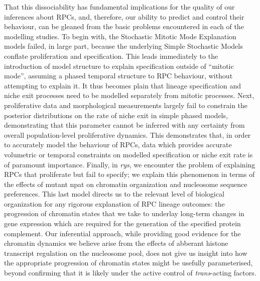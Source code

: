 That this dissociability has fundamental implications for the quality of our inferences about RPCs, and, therefore, our ability to predict and control their behaviour, can be gleaned from the basic problems encountered in each of the modelling studies. To begin with, the Stochastic Mitotic Mode Explanation models failed, in large part, because the underlying Simple Stochastic Models conflate proliferation and specification. This leads immediately to the introduction of model structure to explain specification outside of ``mitotic mode'', assuming a phased temporal structure to RPC behaviour, without attempting to explain it. It thus becomes plain that lineage specification and niche exit processes need to be modelled separately from mitotic processes. Next, proliferative data and morphological measurements largely fail to constrain the posterior distributions on the rate of niche exit in simple phased models, demonstrating that this parameter cannot be inferred with any certainty from overall population-level proliferative dynamics. This demonstrates that, in order to accurately model the behaviour of RPCs, data which provides accurate volumetric or temporal constraints on modelled specification or niche exit rate is of paramount importance. Finally, in \textit{rys}, we encounter the problem of explaining RPCs that proliferate but fail to specify; we explain this phenomenon in terms of the effects of mutant npat on chromatin organization and nucleosome sequence preferences. This last model directs us to the relevant level of biological organization for any rigorous explanation of RPC lineage outcomes: the progression of chromatin states that we take to underlay long-term changes in gene expression which are required for the generation of the specified protein complement. Our inferential approach, while providing good evidence for the chromatin dynamics we believe arise from the effects of abberant histone transcript regulation on the nucleosome pool, does not give us insight into how the appropriate progression of chromatin states might be usefully parameterised, beyond confirming that it is likely under the active control of \textit{trans}-acting factors.

